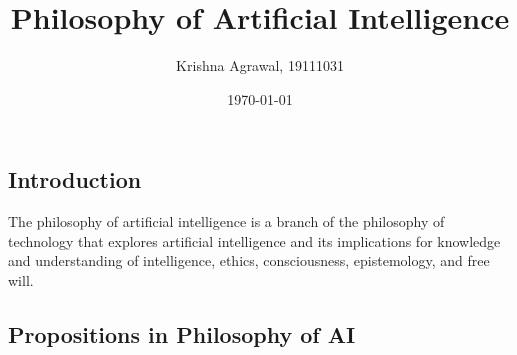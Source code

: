 \documentclass{article}
\title{Philosophy of  Artificial Intelligence}
\author{Krishna Agrawal, 19111031}
\date{\today}
\begin{document}
\maketitle

\subsection*{Introduction}

The philosophy of artificial intelligence is a branch of the philosophy of technology that explores artificial intelligence and its implications for knowledge and understanding of intelligence, ethics, consciousness, epistemology, and free will.
\subsection*{Propositions in Philosophy of AI}
\end{document}

